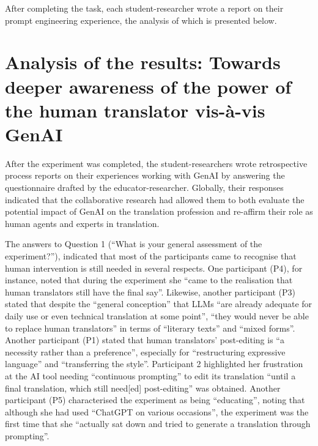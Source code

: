\documentclass[output=paper,colorlinks,citecolor=brown]{langscibook}
\begin{document}
After completing the task, each student-researcher wrote a report on their prompt engineering experience, the analysis of which is presented below.
\section{Analysis of the results: Towards deeper awareness of the power of the human translator vis-à-vis GenAI}
After the experiment was completed, the student-researchers wrote retrospective process reports on their experiences working with GenAI by answering the questionnaire drafted by the educator-researcher. Globally, their responses indicated that the collaborative research had allowed them to both evaluate the potential impact of GenAI on the translation profession and re-affirm their role as human agents and experts in translation.

The answers to Question 1 (“What is your general assessment of the experiment?”), indicated that most of the participants came to recognise that human intervention is still needed in several respects. One participant (P4), for instance, noted that during the experiment she “came to the realisation that human translators still have the final say”. Likewise, another participant (P3) stated that despite the “general conception” that LLMs “are already adequate for daily use or even technical translation at some point”, “they would never be able to replace human translators” in terms of “literary texts” and “mixed forms”. Another participant (P1) stated that human translators' post-editing is “a necessity rather than a preference”, especially for “restructuring expressive language” and “transferring the style”. Participant 2 highlighted her frustration at the AI tool needing “continuous prompting” to edit its translation “until a final translation, which still need[ed] post-editing” was obtained. Another participant (P5) characterised the experiment as being “educating”, noting that although she had used “ChatGPT on various occasions”, the experiment was the first time that she “actually sat down and tried to generate a translation through prompting”.
\end{document}
